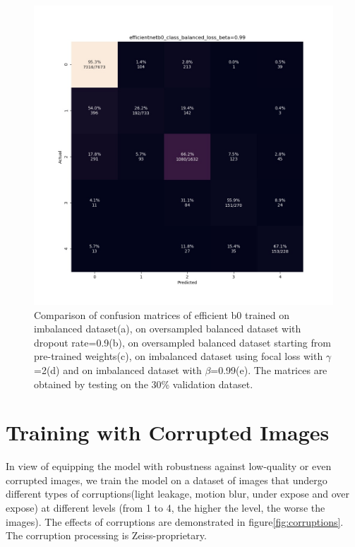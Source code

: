 \documentclass[../main.tex]{subfiles}
\begin{document}
\begin{figure}[htbp]
\begin{minipage}{5cm}
\subcaption{}
\end{minipage}
\begin{minipage}{5cm}
\centering
\includegraphics[width=1\linewidth]{efficientnetb0_class_balanced_loss.jpeg}
\subcaption{}
\end{minipage}
\caption{Comparison of confusion matrices of efficient b0 trained on imbalanced dataset(a), on oversampled balanced dataset with dropout rate=0.9(b), on oversampled balanced dataset starting from pre-trained weights(c), on imbalanced dataset using focal loss with $\gamma$=2(d) and on imbalanced dataset with $\beta$=0.99(e). The matrices are obtained by testing on the 30\% validation dataset.}
\label{fig:confusion_imbalanced}
\end{figure}
\newpage
\section{Training with Corrupted Images}
In view of equipping the model with robustness against low-quality or even corrupted images, we train the model on a dataset of images that undergo different types of corruptions(light leakage, motion blur, under expose and over expose) at different levels (from 1 to 4, the higher the level, the worse the images). The effects of corruptions are demonstrated in figure\ref{fig:corruptions}. The corruption processing is Zeiss-proprietary. 
\end{document}
